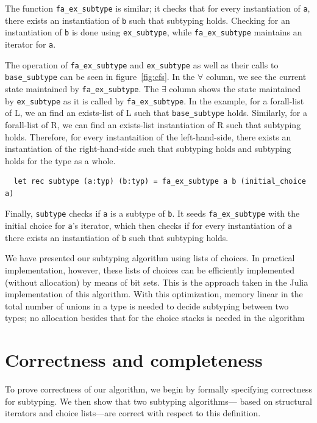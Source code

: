 \documentclass[a4paper,english]{lipics-v2019}
\begin{document}
The function \verb|fa_ex_subtype| is similar; it checks that for every
instantiation of \verb|a|, there exists an instantiation of 
\verb|b| such that subtyping holds. Checking for an instantiation
of \verb|b| is done using \verb|ex_subtype|, while \verb|fa_ex_subtype|
maintains an iterator for \verb|a|.

The operation of \verb|fa_ex_subtype| and \verb|ex_subtype| as well as their
calls to \verb|base_subtype| can be seen in figure~\ref{fig:cfs}. In the
$\forall$ column, we see the current state maintained by \verb|fa_ex_subtype|.
The $\exists$ column shows the state maintained by \verb|ex_subtype| as it is
called by \verb|fa_ex_subtype|. In the example, for a forall-list of L, we an
find an exists-list of L such that \verb|base_subtype| holds. Similarly,
for a forall-list of R, we can find an exists-list instantiation of R such
that subtyping holds. Therefore, for every instantaition of the left-hand-side,
there exists an instantiation of the right-hand-side such that subtyping holds
and subtyping holds for the type as a whole.


\begin{small}
\begin{verbatim}
  let rec subtype (a:typ) (b:typ) = fa_ex_subtype a b (initial_choice a)
\end{verbatim}
\end{small}

Finally, \verb|subtype| checks if \verb|a| is a subtype of \verb|b|.
It seeds \verb|fa_ex_subtype| with the initial choice for \verb|a|'s
iterator, which then checks if for every instantiation of \verb|a|
there exists an instantiation of \verb|b| such that subtyping holds.

We have presented our subtyping algorithm using lists of choices. In practical
implementation, however, these lists of choices can be efficiently implemented
(without allocation) by means of bit sets. This is the approach taken in the Julia
implementation of this algorithm. With this optimization, memory linear in the
total number of unions in a type is needed to decide subtyping between two types;
no allocation besides that for the choice stacks is needed in the algorithm

\section{Correctness and completeness}

To prove correctness of our algorithm, we begin by formally specifying
correctness for subtyping. We then show that two subtyping algorithms---
based on structural iterators and choice lists---are correct
with respect to this definition.
\end{document}
